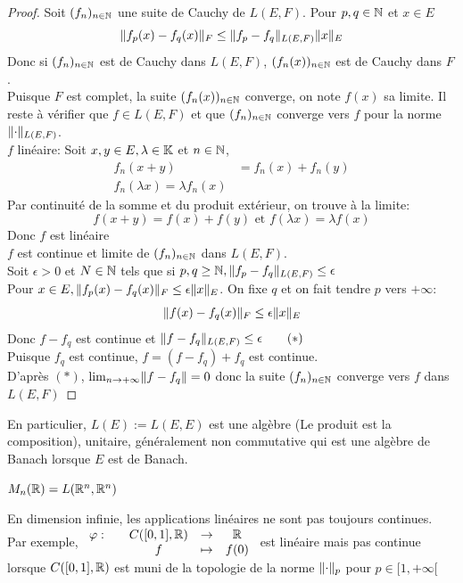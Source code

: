 \documentclass[]{report}
\begin{document}
    \begin{proof}
        Soit $(f_n)_{n\in\mathbb{N}}$ une suite de Cauchy de $L(E,F)$. Pour $p,q\in \mathbb{N}$ et $x\in E$
        \[\lVert f_p(x)-f_q(x) \rVert_F\le \lVert f_p-f_q \rVert_{L(E,F)}\lVert x \rVert_E\]
        Donc si $(f_n)_{n\in\mathbb{N}}$ est de Cauchy dans $L(E,F)$, $(f_n(x))_{n\in\mathbb{N}}$ est de Cauchy dans $F$.\\
        Puisque $F$ est complet, la suite $(f_n(x))_{n\in\mathbb{N}}$ converge, on note $f(x)$ sa limite. Il reste à vérifier que $f\in L(E,F)$ et que $(f_n)_{n\in\mathbb{N}}$ converge vers $f$ pour la norme $\lVert \cdot \rVert_{L(E,F)}$.\\
        $f$ linéaire: Soit $x,y\in E,\lambda \in \mathbb{K}$ et ${n\in\mathbb{N}}$,
        \begin{align*}
            f_n(x+y)&=f_n(x)+f_n(y)\\
            f_n(\lambda x)=\lambda f_n(x)
        \end{align*}
        Par continuité de la somme et du produit extérieur, on trouve à la limite:
        \[f(x+y)=f(x)+f(y)\text{ et }f(\lambda x)=\lambda f(x)\]
        Donc $f$ est linéaire\\
        $f$ est continue et limite de $(f_n)_{n\in\mathbb{N}}$ dans $L(E,F)$.\\
        Soit $\epsilon>0$ et $N\in \mathbb{N}$ tels que si $p,q\ge \mathbb{N}, \lVert f_p-f_q \rVert_{L(E,F)}\le \epsilon$\\
        Pour $x\in E, \lVert f_p(x)-f_q(x) \rVert_F\le \epsilon \lVert x \rVert_E$. On fixe $q$ et on fait tendre $p$ vers $+\infty$:
        \[\lVert f(x)-f_q(x) \rVert_F\le \epsilon \lVert x \rVert_E\]
        Donc $f-f_q$ est continue et $\lVert f-f_q \rVert_{L(E,F)}\le \epsilon\qquad (*)$\\
        Puisque $f_q$ est continue, $f=(f-f_q)+f_q$ est continue.\\
        D'après $(*)$, $\lim_{n\to +\infty}\lVert f-f_q \rVert=0$ donc la suite $(f_n)_{n\in\mathbb{N}}$ converge vers $f$ dans $L(E,F)$
    \end{proof}
    
    \begin{re}{}{}
        En particulier, $L(E):=L(E,E)$ est une algèbre (Le produit est la composition), unitaire, généralement non commutative qui est une algèbre de Banach lorsque $E$ est de Banach.
    \end{re}

    \begin{ex}{}{}
        $M_n(\mathbb{R})=L(\mathbb{R}^n,\mathbb{R}^n)$
    \end{ex}

    \begin{re}{}{}
        En dimension infinie, les applications linéaires ne sont pas toujours continues.\\
        Par exemple, $\begin{array}{ccccc} \varphi : & & C([0,1],\mathbb{R}) & \to & \mathbb{R} \\ & & f & \mapsto & f(0) \end{array}$ est linéaire mais pas continue lorsque $C([0,1],\mathbb{R})$ est muni de la topologie de la norme $\lVert \cdot \rVert_p$ pour $p\in [1,+\infty[$
    \end{re}
\end{document}
